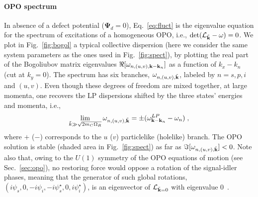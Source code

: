 \paragraph{OPO spectrum}
In absence of a defect potential ($\bm{\Psi}_d =0$),
Eq.~\eqref{eq:fluct} is the eigenvalue equation for the spectrum of
excitations of a homogeneous OPO, i.e.,
$\det(\mathcal{L}_{\tilde{\mathbf{k}}} - \omega)=0$. We plot in
Fig.~\ref{fig:bogol} a typical collective dispersion (here we consider
the same system parameters as the ones used in Fig.~\ref{fig:spect}),
by plotting the real part of the Bogoliubov matrix eigenvalues
$\Re[\omega_{n,(u,v),\mathbf{k}-\mathbf{k}_n}]$ as a function of $k_x - k_n$
(cut at $k_y=0$). The spectrum has six branches,
$\omega_{n,(u,v),\tilde{\mathbf{k}}}$, labeled by $n=s,p,i$ and
$(u,v)$. Even though these degrees of freedom are mixed together, at
large momenta, one recovers the LP dispersions shifted by the three
states' energies and momenta, i.e.,
%
\begin{equation}
  \lim_{\tilde{k} \gg \sqrt{2m_C \Omega_R}} \omega_{n,(u,v),\tilde{\mathbf{k}}} = \pm
  (\omega^{LP}_{\mathbf{k} - \mathbf{k}_n} - \omega_n)\; ,
\label{eq:large}
\end{equation}
%
where $+$ ($-$) corresponds to the $u$ ($v$) particlelike (holelike)
branch.
%
The OPO solution is stable (shaded area in Fig.~\ref{fig:spect}) as
far as $\Im[\omega_{n,(u,v),\tilde{\mathbf{k}}}] < 0$. Note also that,
owing to the $U(1)$ symmetry of the OPO equations of motion (see
Sec.~\ref{sec:opo}), no restoring force would oppose a rotation of the
signal-idler phases, meaning that the generator of such global
rotations,
$(i\psi_s,0,-i\psi_i,-i\psi_{s}^{\star},0,i\psi_{i}^{\star})$, is an
eigenvector of $\mathcal{L}_{\tilde{\mathbf{k}} = 0}$ with eigenvalue
$0$~\cite{Wouters_2007}.

